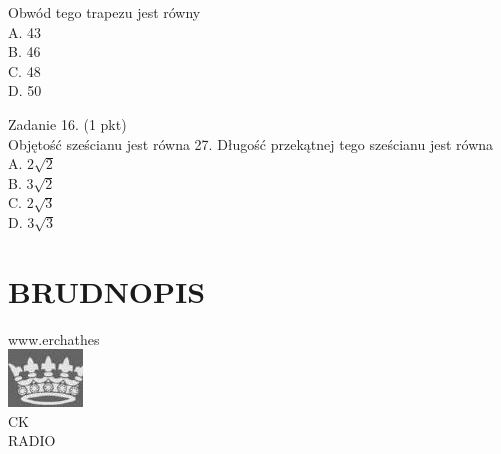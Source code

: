 \documentclass[10pt]{article}
\begin{document}
Obwód tego trapezu jest równy\\
A. 43\\
B. 46\\
C. 48\\
D. 50

Zadanie 16. (1 pkt)\\
Objętość sześcianu jest równa 27. Długość przekątnej tego sześcianu jest równa\\
A. \(2 \sqrt{2}\)\\
B. \(3 \sqrt{2}\)\\
C. \(2 \sqrt{3}\)\\
D. \(3 \sqrt{3}\)

\section*{BRUDNOPIS}
www.erchathes\\
\includegraphics[max width=\textwidth, center]{2024_11_21_2c2c97b7feae6d70b078g-05}\\
CK\\
RADIO
\end{document}
